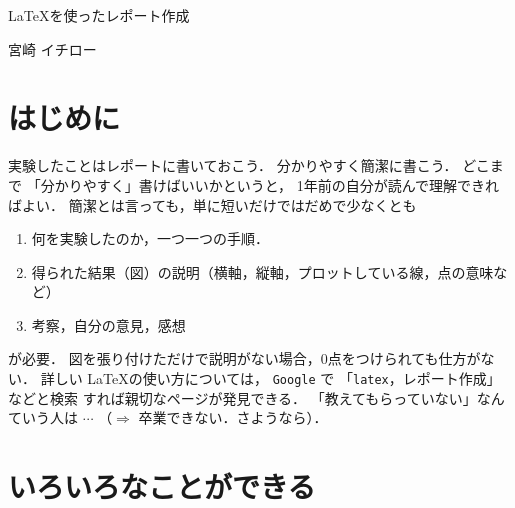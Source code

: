 \documentclass[a4paper,11pt,dvipdfmx]{jarticle}  %
\begin{document}


\centerline{\Large\gt \LaTeX を使ったレポート作成}      
\vskip 5mm
\centerline{\Large{} 宮崎 イチロー}


\section{はじめに} 
実験したことはレポートに書いておこう．
分かりやすく簡潔に書こう．
どこまで
「分かりやすく」書けばいいかというと，
1年前の自分が読んで理解できればよい．
簡潔とは言っても，単に短いだけではだめで少なくとも
\begin{enumerate}
\item 何を実験したのか，一つ一つの手順．
\item 得られた結果（図）の説明（横軸，縦軸，プロットしている線，点の意味など）
\item 考察，自分の意見，感想
\end{enumerate}
が必要．
図を張り付けただけで説明がない場合，0点をつけられても仕方がない．
%
%
詳しい \LaTeX の使い方については，
{\tt Google} で 「{\tt latex}，レポート作成」などと検索
すれば親切なページが発見できる．
「教えてもらっていない」なんていう人は $\cdots$
（$\Longrightarrow$ 卒業できない．さようなら）．


\section{いろいろなことができる}
\end{document}
